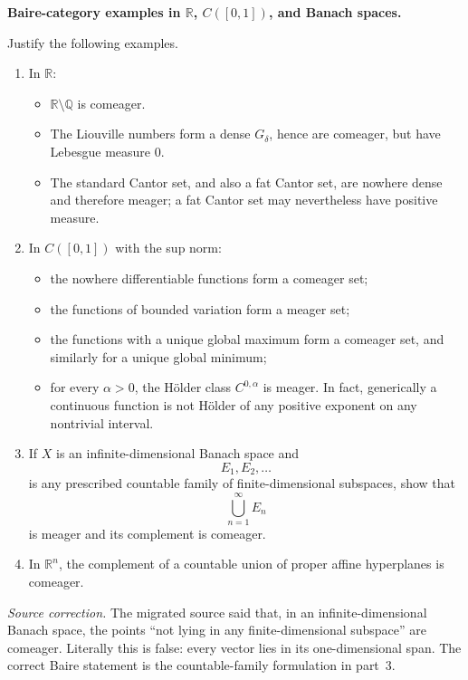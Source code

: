 \begin{problem}[CP-III-0001]
\label{prob:cp-iii-0001}
\textbf{Baire-category examples in \(\mathbb R\), \(C([0,1])\), and Banach spaces.}

Justify the following examples.

\begin{enumerate}
\item In \(\mathbb R\):
\begin{itemize}
\item \(\mathbb R\setminus\mathbb Q\) is comeager.
\item The Liouville numbers form a dense \(G_\delta\), hence are comeager, but have Lebesgue measure \(0\).
\item The standard Cantor set, and also a fat Cantor set, are nowhere dense and therefore meager; a fat Cantor set may nevertheless have positive measure.
\end{itemize}

\item In \(C([0,1])\) with the sup norm:
\begin{itemize}
\item the nowhere differentiable functions form a comeager set;
\item the functions of bounded variation form a meager set;
\item the functions with a unique global maximum form a comeager set, and similarly for a unique global minimum;
\item for every \(\alpha>0\), the Hölder class \(C^{0,\alpha}\) is meager. In fact, generically a continuous function is not Hölder of any positive exponent on any nontrivial interval.
\end{itemize}

\item If \(X\) is an infinite-dimensional Banach space and
\[
E_1,E_2,\dots
\]
is any prescribed countable family of finite-dimensional subspaces, show that
\[
\bigcup_{n=1}^\infty E_n
\]
is meager and its complement is comeager.

\item In \(\mathbb R^n\), the complement of a countable union of proper affine hyperplanes is comeager.
\end{enumerate}

\medskip
\noindent
\textit{Source correction.}
The migrated source said that, in an infinite-dimensional Banach space, the points
``not lying in any finite-dimensional subspace'' are comeager. Literally this is false:
every vector lies in its one-dimensional span. The correct Baire statement is the
countable-family formulation in part~3.
\end{problem}

